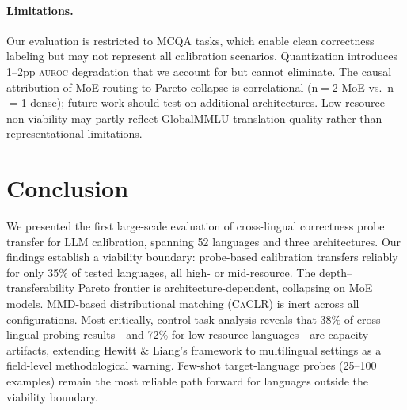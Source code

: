 \documentclass[11pt,a4paper]{article}
\newcommand{\auroc}{\textsc{auroc}}
\newcommand{\caclr}{\textsc{CaCLR}}
\begin{document}
\paragraph{Limitations.}
Our evaluation is restricted to MCQA tasks, which enable clean correctness labeling but may not represent all calibration scenarios.
Quantization introduces 1--2pp \auroc{} degradation that we account for but cannot eliminate.
The causal attribution of MoE routing to Pareto collapse is correlational (n$=$2 MoE vs.\ n$=$1 dense); future work should test on additional architectures.
Low-resource non-viability may partly reflect GlobalMMLU translation quality rather than representational limitations.

\section{Conclusion}
\label{sec:conclusion}

We presented the first large-scale evaluation of cross-lingual correctness probe transfer for LLM calibration, spanning 52 languages and three architectures.
Our findings establish a viability boundary: probe-based calibration transfers reliably for only 35\% of tested languages, all high- or mid-resource.
The depth--transferability Pareto frontier is architecture-dependent, collapsing on MoE models.
MMD-based distributional matching (\caclr{}) is inert across all configurations.
Most critically, control task analysis reveals that 38\% of cross-lingual probing results---and 72\% for low-resource languages---are capacity artifacts, extending Hewitt \& Liang's framework to multilingual settings as a field-level methodological warning.
Few-shot target-language probes (25--100 examples) remain the most reliable path forward for languages outside the viability boundary.
\end{document}
